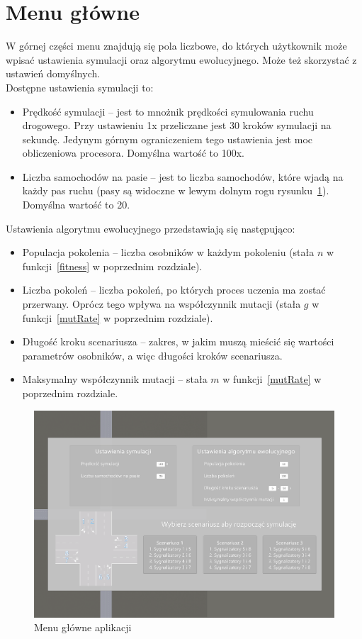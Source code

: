 \section*{Menu główne}
W górnej części menu znajdują się pola liczbowe, do których użytkownik może wpisać ustawienia symulacji oraz algorytmu ewolucyjnego. Może też skorzystać z ustawień domyślnych. \\Dostępne ustawienia symulacji to:
\begin{itemize}
	\item Prędkość symulacji -- jest to mnożnik prędkości symulowania ruchu drogowego. Przy ustawieniu 1x przeliczane jest 30 kroków symulacji na sekundę. Jedynym górnym ograniczeniem tego ustawienia jest moc obliczeniowa procesora. Domyślna wartość to 100x. \\
	\item Liczba samochodów na pasie -- jest to liczba samochodów, które wjadą na każdy pas ruchu (pasy są widoczne w lewym dolnym rogu rysunku~\ref{fig:ap1}). Domyślna wartość to 20.\\
\end{itemize}
Ustawienia algorytmu ewolucyjnego przedstawiają się następująco:
\begin{itemize}
	\item Populacja pokolenia -- liczba osobników w każdym pokoleniu (stała $n$ w funkcji~\ref{fitness} w poprzednim rozdziale).\\
	\item Liczba pokoleń -- liczba pokoleń, po których proces uczenia ma zostać przerwany. Oprócz tego wpływa na współczynnik mutacji (stała $g$ w funkcji~\ref{mutRate} w poprzednim rozdziale).\\
	\item Długość kroku scenariusza -- zakres, w jakim muszą mieścić się wartości parametrów osobników, a więc długości kroków scenariusza.\\
	\item Maksymalny współczynnik mutacji -- stała $m$ w funkcji~\ref{mutRate} w poprzednim rozdziale.\\
\end{itemize}
\begin{figure}[h]
	\centering
	\includegraphics[width=1\linewidth]{ap1}
	\caption[Menu główne aplikacji]{Menu główne aplikacji}
	\label{fig:ap1}
\end{figure}

